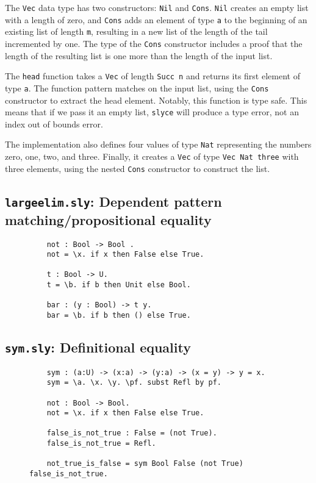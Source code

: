 The \texttt{Vec} data type has two constructors: \texttt{Nil} and \texttt{Cons}. 
\texttt{Nil} creates an empty list with a length of zero, and \texttt{Cons} adds an element of type \texttt{a} to the beginning of an existing list of length \texttt{m}, resulting in a new list of the length of the tail incremented by one. 
The type of the \texttt{Cons} constructor includes a proof that the length of the resulting list is one more than the length of the input list.

The \texttt{head} function takes a \texttt{Vec} of length \texttt{Succ n} and returns its first element of type \texttt{a}. 
The function pattern matches on the input list, using the \texttt{Cons} constructor to extract the head element.
Notably, this function is type safe. 
This means that if we pass it an empty list, \texttt{slyce} will produce a type error, not an index out of bounds error.

The implementation also defines four values of type \texttt{Nat} representing the numbers zero, one, two, and three. 
Finally, it creates a \texttt{Vec} of type \texttt{Vec Nat three} with three elements, using the nested \texttt{Cons} constructor to construct the list.

\subsection{\texttt{largeelim.sly}: Dependent pattern matching/propositional equality}
\begin{figure}[h!]
\begin{lstlisting}
    not : Bool -> Bool .
    not = \x. if x then False else True.
    
    t : Bool -> U.
    t = \b. if b then Unit else Bool.
    
    bar : (y : Bool) -> t y.
    bar = \b. if b then () else True.    
\end{lstlisting}
\end{figure}

\subsection{\texttt{sym.sly}: Definitional equality}
\begin{figure}[h!]
\begin{lstlisting}
    sym : (a:U) -> (x:a) -> (y:a) -> (x = y) -> y = x.
    sym = \a. \x. \y. \pf. subst Refl by pf.

    not : Bool -> Bool.
    not = \x. if x then False else True.

    false_is_not_true : False = (not True).
    false_is_not_true = Refl.

    not_true_is_false = sym Bool False (not True) false_is_not_true.
\end{lstlisting}
\end{figure}
